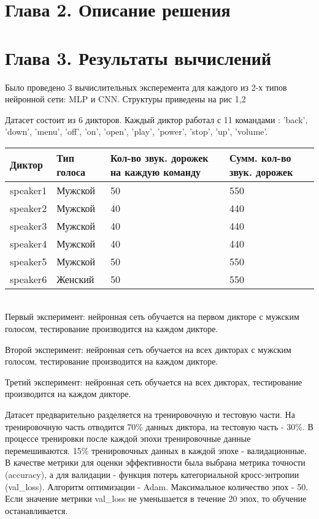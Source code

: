 \documentclass[14pt]{article}
\begin{document}
\section*{Глава 2. Описание решения}
\newpage

\section*{Глава 3. Результаты вычислений}
Было проведено 3 вычислительных эксперемента для каждого из 2-х типов нейронной сети: MLP и CNN. Структуры приведены на рис 1,2

Датасет состоит из 6 дикторов. Каждый диктор работал с 11 командами : 'back', 'down', 'menu', 'off', 'on', 'open', 'play', 'power', 'stop', 'up', 'volume'.
\\

\begin{tabular}[c]{ | p{2cm} | p{2cm} | p{6cm} | p{4cm} | }
\hline
Диктор & Тип голоса & Кол-во звук. дорожек на каждую команду & Сумм. кол-во звук. дорожек  \\ \hline
speaker1 & Мужской & 50 & 550 \\
speaker2 & Мужской & 40 & 440 \\
speaker3 & Мужской & 40 & 440 \\
speaker4 & Мужской & 40 & 440 \\
speaker5 & Мужской & 50 & 550 \\
speaker6 & Женский & 50 & 550 \\ \hline
\end{tabular}
\\

Первый эксперимент: нейронная сеть обучается на первом дикторе с мужским голосом, тестирование производится на каждом дикторе. 

Второй эксперимент: нейронная сеть обучается на всех дикторах с мужским голосом, тестирование производится на каждом дикторе. 

Третий эксперимент: нейронная сеть обучается на всех дикторах, тестирование производится на каждом дикторе.

Датасет предварительно разделяется на тренировочную и тестовую части. На тренировочную часть отводится 70\% данных диктора, на тестовую часть - 30\%. В процессе тренировки после каждой эпохи тренировочные данные перемешиваются. 15\% тренировочных данных в каждой эпохе - валидационные. В качестве метрики для оценки эффективности была выбрана метрика точности (accuracy), а для валидации - функция потерь категориальной кросс-энтропии (val\_loss). Алгоритм оптимизации - Adam. Максимальное количество эпох - 50. Если значение метрики val\_loss не уменьшается в течение 20 эпох, то обучение останавливается.
\end{document}
